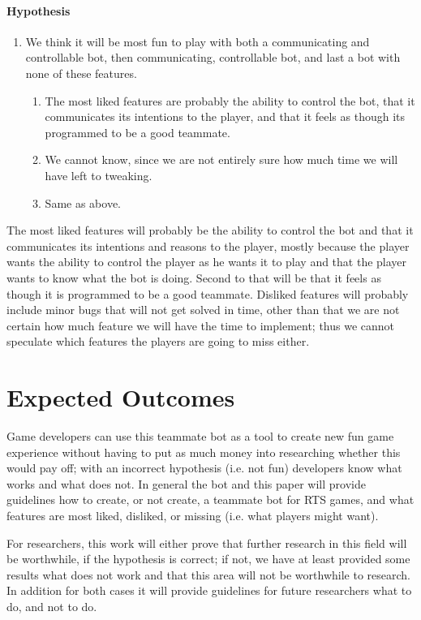\paragraph{Hypothesis}
\begin{enumerate}
	\item We think it will be most fun to play with both a communicating and controllable bot, then communicating, controllable bot, and last a bot with none of these features.
	\begin{enumerate}
		\item The most liked features are probably the ability to control the bot, that it communicates its intentions to the player, and that it feels as though its programmed to be a good teammate.
		\item We cannot know, since we are not entirely sure how much time we will have left to tweaking.
		\item Same as above.
	\end{enumerate}
\end{enumerate}

The most liked features will probably be the ability to control the bot and that it communicates its intentions and reasons to the player, mostly because the player wants the ability to control the player as he wants it to play and that the player wants to know what the bot is doing. Second to that will be that it feels as though it is programmed to be a good teammate. Disliked features will probably include minor bugs that will not get solved in time, other than that we are not certain how much feature we will have the time to implement; thus we cannot speculate which features the players are going to miss either.

\section{Expected Outcomes}
Game developers can use this teammate bot as a tool to create new fun game experience without having to put as much money into researching whether this would pay off; with an incorrect hypothesis (i.e. not fun) developers know what works and what does not. In general the bot and this paper will provide guidelines how to create, or not create, a teammate bot for RTS games, and what features are most liked, disliked, or missing (i.e. what players might want).

For researchers, this work will either prove that further research in this field will be worthwhile, if the hypothesis is correct; if not, we have at least provided some results what does not work and that this area will not be worthwhile to research. In addition for both cases it will provide guidelines for future researchers what to do, and not to do.